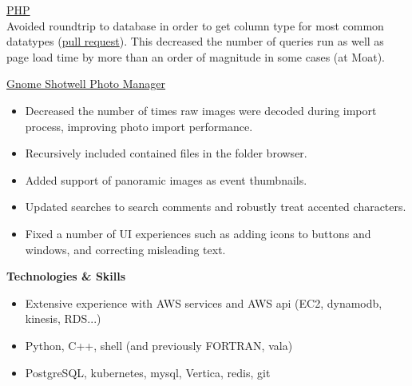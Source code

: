\vspace{\littleskip}
\vspace{\littleskip}

\myfontsize{\littleheader}
\href{https://github.com/php/php-src}{PHP}\\
\myfontsize{\bodysize}
Avoided roundtrip to database in order to get column type for most common datatypes (\href{https://github.com/php/php-src/pull/1534}{pull request}).
This decreased the number of queries run as well as page load time by more than an order of magnitude in some cases (at Moat).

\vspace{\littleskip}
\vspace{\littleskip}

\myfontsize{\littleheader}
\href{https://gitlab.gnome.org/GNOME/shotwell}{Gnome Shotwell Photo Manager}\\
\myfontsize{\bodysize}
\begin{itemize}[topsep=1ex, partopsep=0ex, parsep=0ex, itemsep=0.5ex]
    \item Decreased the number of times raw images were decoded during import process, improving photo import performance.
    \item Recursively included contained files in the folder browser.
    \item Added support of panoramic images as event thumbnails.
    \item Updated searches to search comments and robustly treat accented characters.
    \item Fixed a number of UI experiences such as adding icons to buttons and windows, and correcting misleading text.
\end{itemize}


\vspace{\mybigskip}
\myfontsize{\littleheader}
\textbf{Technologies \& Skills}\\
\myfontsize{\bodysize}
\begin{itemize}[topsep=1ex, partopsep=0ex, parsep=0ex, itemsep=0.5ex]
    \item Extensive experience with AWS services and AWS api (EC2, dynamodb, kinesis, RDS...)
    \item Python, C++, shell (and previously FORTRAN, vala)
    \item PostgreSQL, kubernetes, mysql, Vertica, redis, git
\end{itemize}


\iffalse

\fi

